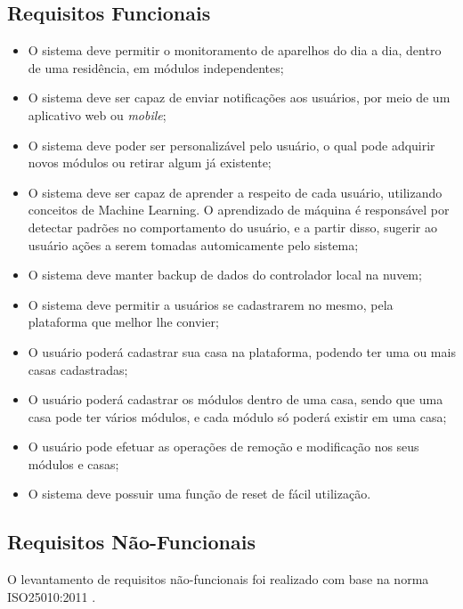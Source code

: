 \subsection{Requisitos Funcionais}
\begin{itemize}
\item O sistema deve permitir o monitoramento de aparelhos do dia a dia, dentro de uma residência, em módulos independentes;
\item O sistema deve ser capaz de enviar notificações aos usuários, por meio de um aplicativo web ou \textit{mobile};
\item O sistema deve poder ser personalizável pelo usuário, o qual pode adquirir novos módulos ou retirar algum já existente;
\item O sistema deve ser capaz de aprender a respeito de cada usuário, utilizando conceitos de Machine Learning. O aprendizado de máquina é responsável por detectar padrões no comportamento do usuário, e a partir disso, sugerir ao usuário ações a serem tomadas automicamente pelo sistema;
\item O sistema deve manter backup de dados do controlador local na nuvem;
\item O sistema deve permitir a usuários se cadastrarem no mesmo, pela plataforma que melhor lhe convier;
\item O usuário poderá cadastrar sua casa na plataforma, podendo ter uma ou mais casas cadastradas;
\item O usuário poderá cadastrar os módulos dentro de uma casa, sendo que uma casa pode ter vários módulos, e cada módulo só poderá existir em uma casa;
\item O usuário pode efetuar as operações de remoção e modificação nos seus módulos e casas;
\item O sistema deve possuir uma função de reset de fácil utilização.
\end{itemize}

\subsection{Requisitos Não-Funcionais}
O levantamento de requisitos não-funcionais foi realizado com base na norma ISO25010:2011 \cite{iso25010}.

